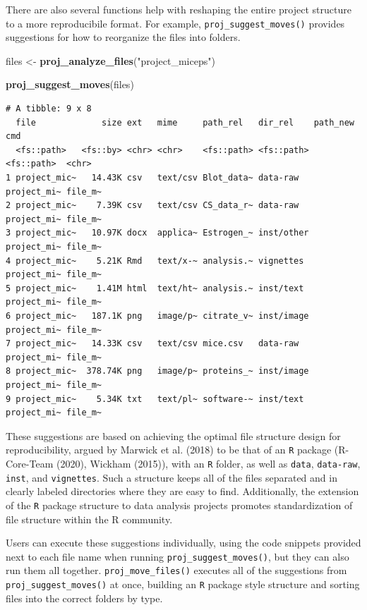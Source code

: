 \documentclass[12pt,twoside]{reedthesis}
\newenvironment{Shaded}{\begin{snugshade}}{\end{snugshade}}
\newcommand{\KeywordTok}[1]{\textcolor[rgb]{0.13,0.29,0.53}{\textbf{#1}}}
\newcommand{\NormalTok}[1]{#1}
\newcommand{\StringTok}[1]{\textcolor[rgb]{0.31,0.60,0.02}{#1}}
\begin{document}
There are also several functions help with reshaping the entire project structure to a more reproducibile format. For example, \texttt{proj\_suggest\_moves()} provides suggestions for how to reorganize the files into folders.
\begin{Shaded}
\begin{Highlighting}[]
\NormalTok{files <-}\StringTok{ }\KeywordTok{proj_analyze_files}\NormalTok{(}\StringTok{"project_miceps"}\NormalTok{)}

\KeywordTok{proj_suggest_moves}\NormalTok{(files)}
\end{Highlighting}
\end{Shaded}
\begin{verbatim}
# A tibble: 9 x 8
  file             size ext   mime     path_rel   dir_rel    path_new    cmd    
  <fs::path>   <fs::by> <chr> <chr>    <fs::path> <fs::path> <fs::path>  <chr>  
1 project_mic~   14.43K csv   text/csv Blot_data~ data-raw   project_mi~ file_m~
2 project_mic~    7.39K csv   text/csv CS_data_r~ data-raw   project_mi~ file_m~
3 project_mic~   10.97K docx  applica~ Estrogen_~ inst/other project_mi~ file_m~
4 project_mic~    5.21K Rmd   text/x-~ analysis.~ vignettes  project_mi~ file_m~
5 project_mic~    1.41M html  text/ht~ analysis.~ inst/text  project_mi~ file_m~
6 project_mic~   187.1K png   image/p~ citrate_v~ inst/image project_mi~ file_m~
7 project_mic~   14.33K csv   text/csv mice.csv   data-raw   project_mi~ file_m~
8 project_mic~  378.74K png   image/p~ proteins_~ inst/image project_mi~ file_m~
9 project_mic~    5.34K txt   text/pl~ software-~ inst/text  project_mi~ file_m~
\end{verbatim}
These suggestions are based on achieving the optimal file structure design for reproducibility, argued by Marwick et al. (2018) to be that of an \texttt{R} package (R-Core-Team (2020), Wickham (2015)), with an \texttt{R} folder, as well as \texttt{data}, \texttt{data-raw}, \texttt{inst}, and \texttt{vignettes}. Such a structure keeps all of the files separated and in clearly labeled directories where they are easy to find. Additionally, the extension of the \texttt{R} package structure to data analysis projects promotes standardization of file structure within the R community.

Users can execute these suggestions individually, using the code snippets provided next to each file name when running \texttt{proj\_suggest\_moves()}, but they can also run them all together. \texttt{proj\_move\_files()} executes all of the suggestions from \texttt{proj\_suggest\_moves()} at once, building an \texttt{R} package style structure and sorting files into the correct folders by type.
\end{document}
